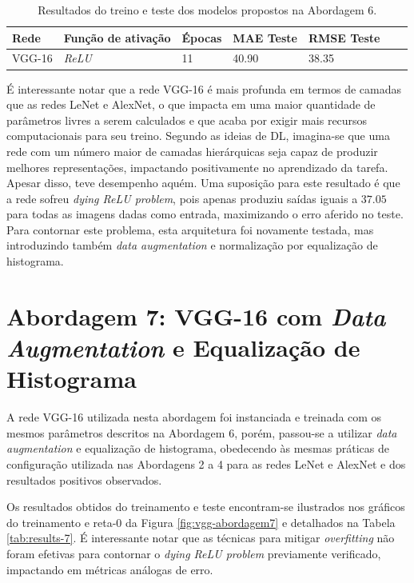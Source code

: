 		\begin{table}[!ht]
			\centering
			\caption{Resultados do treino e teste dos modelos propostos na Abordagem 6.}
			\label{tab:results-6}
			\begin{tabular}{l l l l l l l}
				\toprule
				Rede & Função de ativação & Épocas & MAE Teste & RMSE Teste \\
				\midrule
				VGG-16 & \emph{ReLU} & 11 & 40.90 & 38.35 \\
				\bottomrule
			\end{tabular}
		\end{table}

		É interessante notar que a rede VGG-16 é mais profunda em termos de camadas que as redes LeNet e AlexNet, o que impacta em uma maior quantidade de parâmetros livres a serem calculados e que acaba por exigir mais recursos computacionais para seu treino. Segundo as ideias de DL, imagina-se que uma rede com um número maior de camadas hierárquicas seja capaz de produzir melhores representações, impactando positivamente no aprendizado da tarefa. Apesar disso, teve desempenho aquém. Uma suposição para este resultado é que a rede sofreu \emph{dying ReLU problem}, pois apenas produziu saídas iguais a $37.05$ para todas as imagens dadas como entrada, maximizando o erro aferido no teste. Para contornar este problema, esta arquitetura foi novamente testada, mas introduzindo também \emph{data augmentation} e normalização por equalização de histograma.



\section{Abordagem 7: VGG-16 com \emph{Data Augmentation} e Equalização de Histograma}

	A rede VGG-16 utilizada nesta abordagem foi instanciada e treinada com os mesmos parâmetros descritos na Abordagem 6, porém, passou-se a utilizar \emph{data augmentation} e equalização de histograma, obedecendo às mesmas práticas de configuração utilizada nas Abordagens 2 a 4 para as redes LeNet e AlexNet e dos resultados positivos observados.

	Os resultados obtidos do treinamento e teste encontram-se ilustrados nos gráficos do treinamento e reta-0 da Figura \ref{fig:vgg-abordagem7} e detalhados na Tabela \ref{tab:results-7}. É interessante notar que as técnicas para mitigar \emph{overfitting} não foram efetivas para contornar o \emph{dying ReLU problem} previamente verificado, impactando em métricas análogas de erro.

